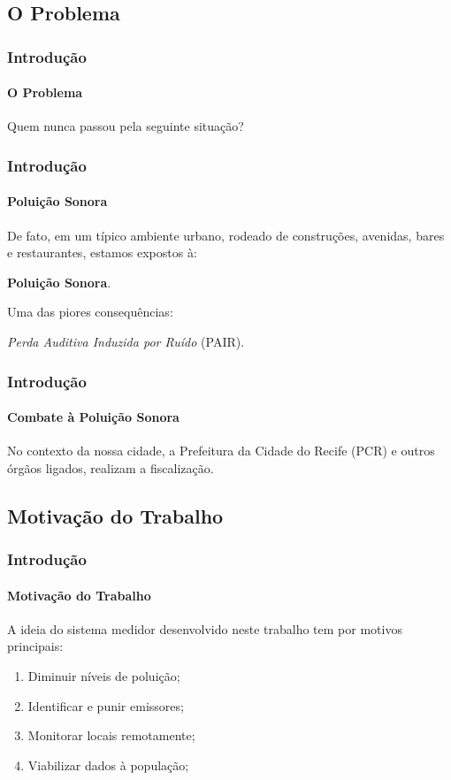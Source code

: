 \documentclass[brazil]{beamer}
\begin{document}
	\subsection{O Problema}

	\begin{frame}
		\frametitle{Introdução}
		\framesubtitle{O Problema}
		\begin{center}
			Quem nunca passou pela seguinte situação?
		\end{center}
	\end{frame}

	\begin{frame}
		\frametitle{Introdução}
		\framesubtitle{Poluição Sonora}
		De fato, em um típico ambiente urbano, rodeado de construções, avenidas, bares e restaurantes, estamos expostos à:\\[0.5cm] 
		\begin{center}
			\textbf{Poluição Sonora}.
		\end{center}
		\pause
		\begin{flushleft}
			Uma das piores consequências:
		\end{flushleft} 
		\begin{center}
			\textit{Perda Auditiva Induzida por Ruído} (PAIR).
		\end{center}
		
	\end{frame}

	\begin{frame}
		\frametitle{Introdução}
		\framesubtitle{Combate à Poluição Sonora}
		\vspace{0.5cm}
		No contexto da nossa cidade, a Prefeitura da Cidade do Recife (PCR) e outros órgãos ligados, realizam a fiscalização.
	\end{frame}

	\subsection{Motivação do Trabalho}

	\begin{frame}
		\frametitle{Introdução}
		\framesubtitle{Motivação do Trabalho}
		A ideia do sistema medidor desenvolvido neste trabalho tem por motivos principais:\\[0.2cm]
		\begin{enumerate}
			\item Diminuir níveis de poluição; %
			\item Identificar e punir emissores; %
			\item Monitorar locais remotamente;
			\item Viabilizar dados à população;
		\end{enumerate}
	\end{frame}
\end{document}
